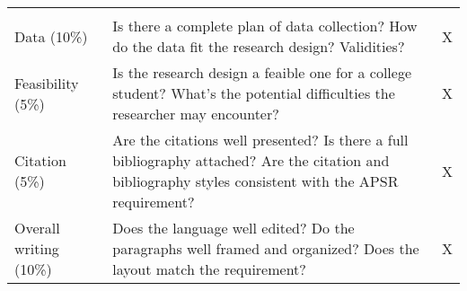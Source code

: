 \documentclass[11pt,]{article}
\theoremstyle{definition}
\theoremstyle{definition}
\theoremstyle{remark}
\begin{document}
\begin{longtable}[]{@{}lll@{}}
\begin{minipage}[t]{0.03\columnwidth}
\end{minipage}\tabularnewline
\begin{minipage}[t]{0.12\columnwidth}\raggedright\strut
Data (10\%)\strut
\end{minipage} & \begin{minipage}[t]{0.76\columnwidth}\raggedright\strut
Is there a complete plan of data collection? How do the data fit the
research design? Validities?\strut
\end{minipage} & \begin{minipage}[t]{0.03\columnwidth}\raggedright\strut
X\strut
\end{minipage}\tabularnewline
\begin{minipage}[t]{0.12\columnwidth}\raggedright\strut
Feasibility (5\%)\strut
\end{minipage} & \begin{minipage}[t]{0.76\columnwidth}\raggedright\strut
Is the research design a feaible one for a college student? What's the
potential difficulties the researcher may encounter?\strut
\end{minipage} & \begin{minipage}[t]{0.03\columnwidth}\raggedright\strut
X\strut
\end{minipage}\tabularnewline
\begin{minipage}[t]{0.12\columnwidth}\raggedright\strut
Citation (5\%)\strut
\end{minipage} & \begin{minipage}[t]{0.76\columnwidth}\raggedright\strut
Are the citations well presented? Is there a full bibliography attached?
Are the citation and bibliography styles consistent with the APSR
requirement?\strut
\end{minipage} & \begin{minipage}[t]{0.03\columnwidth}\raggedright\strut
X\strut
\end{minipage}\tabularnewline
\begin{minipage}[t]{0.12\columnwidth}\raggedright\strut
Overall writing (10\%)\strut
\end{minipage} & \begin{minipage}[t]{0.76\columnwidth}\raggedright\strut
Does the language well edited? Do the paragraphs well framed and
organized? Does the layout match the requirement?\strut
\end{minipage} & \begin{minipage}[t]{0.03\columnwidth}\raggedright\strut
X\strut
\end{minipage}\tabularnewline
\bottomrule
\end{longtable}
\end{document}
